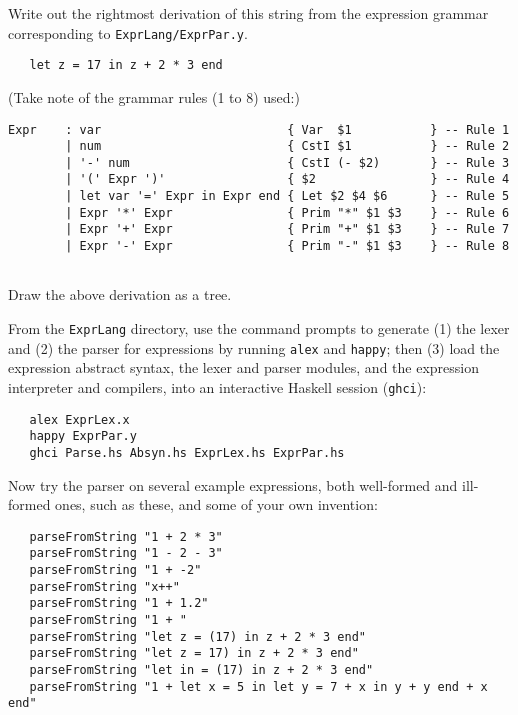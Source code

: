\documentclass[a4paper]{article}
\begin{document}
\begin{exercise}\label{exer-expr-derivation}
  Write out the rightmost derivation of this string from the
  expression grammar corresponding to \texttt{ExprLang/ExprPar.y}\@.  

{\codesetup\begin{verbatim}
   let z = 17 in z + 2 * 3 end 
\end{verbatim}} 

\noindent
  (Take note of the grammar rules (1 to 8) used:)
  
{\codesetup\begin{verbatim}
Expr    : var                          { Var  $1           } -- Rule 1
        | num                          { CstI $1           } -- Rule 2
        | '-' num                      { CstI (- $2)       } -- Rule 3
        | '(' Expr ')'                 { $2                } -- Rule 4
        | let var '=' Expr in Expr end { Let $2 $4 $6      } -- Rule 5
        | Expr '*' Expr                { Prim "*" $1 $3    } -- Rule 6
        | Expr '+' Expr                { Prim "+" $1 $3    } -- Rule 7
        | Expr '-' Expr                { Prim "-" $1 $3    } -- Rule 8
        
\end{verbatim}}   
\end{exercise}


\begin{exercise}\label{exer-expr-derivation-tree}
  Draw the above derivation as a tree. 
\end{exercise}


\begin{exercise}\label{exer-expr-parse-try}
  From the \texttt{ExprLang} directory, use the command prompts
  to generate (1) the lexer and (2) the parser for
  expressions by running \texttt{alex} and \texttt{happy}; then (3)
  load the expression abstract syntax, the lexer and parser modules,
  and the expression interpreter and compilers, into an interactive
  Haskell session (\texttt{ghci}):

{\codesetup\begin{verbatim}
   alex ExprLex.x
   happy ExprPar.y
   ghci Parse.hs Absyn.hs ExprLex.hs ExprPar.hs
\end{verbatim}} 

\noindent 
Now try the parser on several example expressions, both well-formed
and ill-formed ones, such as these, and some of your own invention:

{\codesetup\begin{verbatim}
   parseFromString "1 + 2 * 3"
   parseFromString "1 - 2 - 3"
   parseFromString "1 + -2"
   parseFromString "x++"
   parseFromString "1 + 1.2"
   parseFromString "1 + "
   parseFromString "let z = (17) in z + 2 * 3 end"
   parseFromString "let z = 17) in z + 2 * 3 end"
   parseFromString "let in = (17) in z + 2 * 3 end"
   parseFromString "1 + let x = 5 in let y = 7 + x in y + y end + x end"
\end{verbatim}}  
  
\end{exercise}
\end{document}
